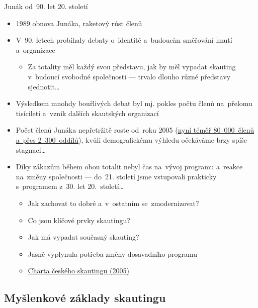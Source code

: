 \documentclass[compress, xelatex, 11pt, xcolor=dvipsnames, aspectratio=169, url={hyphens, lowtilde}]{beamer}
\begin{document}
\begin{frame}{Junák od~90. let 20. století}
	\begin{itemize}
		\item 1989 obnova Junáka, raketový růst členů
		\item V~90. letech probíhaly debaty o~identitě a~budoucím směřování hnutí a~organizace
		\begin{itemize}
			\item Za totality měl každý svou představu, jak by měl vypadat skauting v~budoucí svobodné společnosti --- trvalo dlouho různé představy sjednotit\ldots
		\end{itemize}
		\item Výsledkem mnohdy bouřlivých debat byl mj. pokles počtu členů na~přelomu tisíciletí a~vznik dalších skautských organizací
		\item Počet členů Junáka nepřetržitě roste od~roku 2005 (\href{https://www.skaut.cz/skauting/fakta-a-cisla/}{nyní téměř 80~000~členů a~přes 2~300~oddílů}), kvůli demografickému výhledu očekáváme brzy spíše stagnaci\ldots
		\item Díky zákazům během obou totalit nebyl čas na~vývoj programu a~reakce na~změny společnosti --- do~21. století jsme vstupovali prakticky s~programem z~30. let 20.~století\ldots
		\begin{itemize}
			\item Jak zachovat to dobré a~v~ostatním se~zmodernizovat?
			\item Co jsou klíčové prvky skautingu?
			\item Jak má vypadat současný skauting?
			\item Jasně vyplynula potřeba změny dosavadního programu
			\item \href{https://drive.google.com/file/d/1oq0Nz7ZnYIq6pac_f6G1oI8awuO9rjoz/view}{Charta českého skautingu (2005)}
		\end{itemize}
	\end{itemize}
\end{frame}

\subsection{Myšlenkové základy skautingu}
\end{document}
